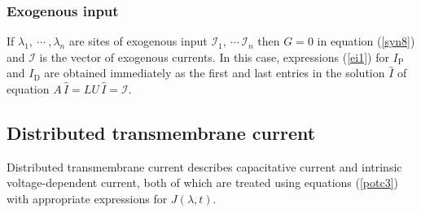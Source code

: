 \subsubsection{Exogenous input}
If $\lambda_1,\ \cdots\ ,\lambda_n$ are sites of exogenous input
$\mathcal{I}_1,\ \cdots \,\mathcal{I}_n$ then $G=0$ in equation
(\ref{syn8}) and $\mathcal{I}$ is the vector of exogenous
currents. In this case, expressions (\ref{ei1}) for $I_\mathrm{P}$
and $I_\mathrm{D}$ are obtained immediately as the first and last
entries in the solution $\widehat{I}$ of equation
$A\,\widehat{I}=LU\,\widehat{I}=\mathcal{I}$.

\subsection{Distributed transmembrane current}
Distributed transmembrane current describes capacitative current
and intrinsic voltage-dependent current, both of which are treated
using equations (\ref{potc3}) with appropriate expressions for
$J(\lambda,t)$.

